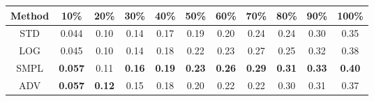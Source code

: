 \documentclass{standalone}
\begin{document}
\begin{tabular}{c|cccccccccc}
      \toprule
      Method & 10\% & 20\% & 30\% & 40\% & 50\% & 60\% & 70\% & 80\% & 90\% & 100\% \\
      \midrule
STD & 0.044 & 0.10 & 0.14 & 0.17 & 0.19 & 0.20 & 0.24 & 0.24 & 0.30 & 0.35\\
LOG & 0.045 & 0.10 & 0.14 & 0.18 & 0.22 & 0.23 & 0.27 & 0.25 & 0.32 & 0.38\\
SMPL & \textbf{0.057} & 0.11 & \textbf{0.16} & \textbf{0.19} & \textbf{0.23} & \textbf{0.26} & \textbf{0.29} & \textbf{0.31} & \textbf{0.33} & \textbf{0.40}\\
ADV & \textbf{0.057} & \textbf{0.12} & 0.15 & 0.18 & 0.20 & 0.22 & 0.22 & 0.30 & 0.31 & 0.37\\
  \bottomrule
\end{tabular}
\end{document}
